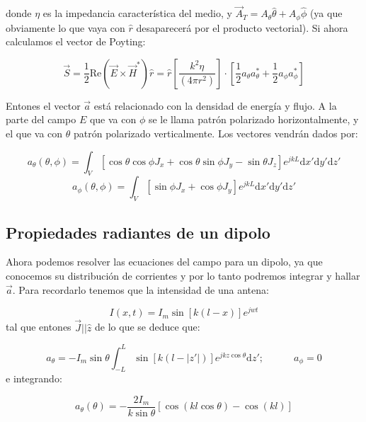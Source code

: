 \documentclass[12pt,a4paper]{article}
\newcommand{\ccorchetes}[1]{\left[ #1  \right]}
\newcommand{\D}{\mathrm{d}}
\newcommand{\tquad}{\quad \quad \quad}
\begin{document}
donde $\eta$ es la impedancia característica del medio, y $\vec{A}_T = A_\theta \hat{\theta} + A_\phi \hat{\phi}$ (ya que obviamente lo que vaya con $\hat{r}$   desaparecerá por el producto vectorial). Si ahora  calculamos el vector de Poyting:

\begin{equation}
\vec{S} = \dfrac{1}{2} \mathrm{Re} (\vec{E} \times \vec{H}^*) \hat{r} = \hat{r} \ccorchetes{\frac{k^2 \eta}{(4 \pi r^2)}} \cdot \ccorchetes{\dfrac{1}{2} a_{\theta} a_\theta^* + \dfrac{1}{2} a_\phi a_\phi^*} 
\end{equation}

Entones el vector $\vec{a}$ está relacionado con la densidad de energía y flujo. A la parte del campo $E$ que va con $\phi$ se le llama patrón polarizado horizontalmente, y el que va con $\theta$ patrón polarizado verticalmente. Los vectores vendrán dados por:

\begin{equation}
a_\theta (\theta, \phi) = \int_V [\cos \theta \cos \phi J_x + \cos \theta \sin \phi J_y - \sin \theta J_z] e^{jkL} \D x' \D y' \D z'
\end{equation}
\begin{equation}
a_\phi (\theta, \phi) = \int_V [\sin \phi J_x +  \cos \phi J_y ]e^{jkL} \D x' \D y' \D z'
\end{equation}


\subsection{Propiedades radiantes de un dipolo}

Ahora podemos resolver las ecuaciones del campo para un dipolo, ya que conocemos su distribución de corrientes y por lo tanto podremos integrar y hallar $\vec{a}$. Para recordarlo tenemos que la intensidad de una antena:

\begin{equation}
I(x,t) = I_m \sin [k(l-x)] e^{jwt}
\end{equation}
tal que entones $\vec{J} || \hat{z}$ de lo que se deduce que: 

\begin{equation}
a_\theta = - I_m \sin \theta \int_{-L}^L \sin [k (l - |z'|)] e^{jkz \cos \theta} \D z'; \tquad a_\phi=0
 \end{equation}
e integrando:

\begin{equation}
a_\theta(\theta) = - \dfrac{2 I_m}{k \sin \theta} [ \cos (kl \cos \theta) - \cos (kl)]
\end{equation}
\end{document}
